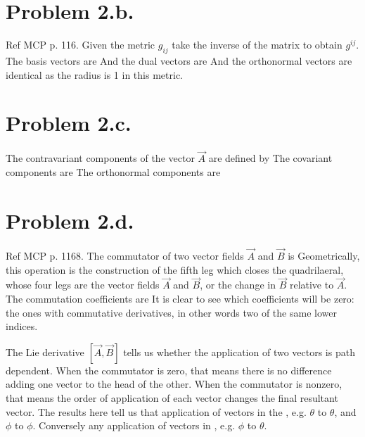 \documentclass{article}
\begin{document}
\section*{Problem 2.b.}
Ref MCP p. 116. Given the metric $g_{ij}$ take the inverse of the matrix to obtain $g^{ij}$.
The basis vectors are
And the dual vectors are
And the orthonormal vectors are identical as the radius is 1 in this metric.
\section*{Problem 2.c.}
The contravariant components of the vector $\vec{A}$ are defined by
The covariant components are
The orthonormal components are
\section*{Problem 2.d.}
Ref MCP p. 1168. The commutator of two vector fields $\vec{A}$ and $\vec{B}$ is 
Geometrically, this operation is the construction of the fifth leg which closes the quadrilaeral, whose four legs are the vector fields $\vec{A}$ and $\vec{B}$, or the change in $\vec{B}$ relative to $\vec{A}$. The commutation coefficients are
It is clear to see which coefficients will be zero: the ones with commutative derivatives, in other words two of the same lower indices.

The Lie derivative $[\vec{A},\vec{B}]$ tells us whether the application of two vectors is path dependent. When the commutator is zero, that means there is no difference adding one vector to the head of the other. When the commutator is nonzero, that means the order of application of each vector changes the final resultant vector. The results here tell us that application of vectors in the , e.g. $\theta$ to $\theta$, and $\phi$ to $\phi$. Conversely any application of vectors in , e.g. $\phi$ to $\theta$.
\end{document}

